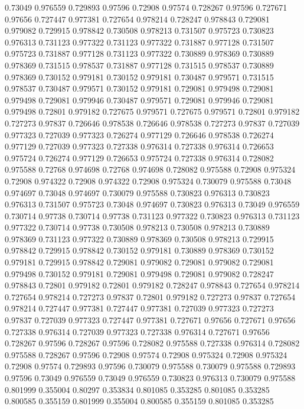 0.73049 0.976559
0.729893 0.97596
0.72908 0.97574
0.728267 0.97596
0.727671 0.97656
0.727447 0.977381
0.727654 0.978214
0.728247 0.978843
0.729081 0.979082
0.729915 0.978842
0.730508 0.978213
0.731507 0.975723
0.730823 0.976313
0.731123 0.977322
0.731123 0.977322
0.731887 0.977128
0.731507 0.975723
0.731887 0.977128
0.731123 0.977322
0.730889 0.978369
0.730889 0.978369
0.731515 0.978537
0.731887 0.977128
0.731515 0.978537
0.730889 0.978369
0.730152 0.979181
0.730152 0.979181
0.730487 0.979571
0.731515 0.978537
0.730487 0.979571
0.730152 0.979181
0.729081 0.979498
0.729081 0.979498
0.729081 0.979946
0.730487 0.979571
0.729081 0.979946
0.729081 0.979498
0.72801 0.979182
0.727675 0.979571
0.727675 0.979571
0.72801 0.979182
0.727273 0.97837
0.726646 0.978538
0.726646 0.978538
0.727273 0.97837
0.727039 0.977323
0.727039 0.977323
0.726274 0.977129
0.726646 0.978538
0.726274 0.977129
0.727039 0.977323
0.727338 0.976314
0.727338 0.976314
0.726653 0.975724
0.726274 0.977129
0.726653 0.975724
0.727338 0.976314
0.728082 0.975588
0.72768 0.974698
0.72768 0.974698
0.728082 0.975588
0.72908 0.975324
0.72908 0.974322
0.72908 0.974322
0.72908 0.975324
0.730079 0.975588
0.73048 0.974697
0.73048 0.974697
0.730079 0.975588
0.730823 0.976313
0.730823 0.976313
0.731507 0.975723
0.73048 0.974697
0.730823 0.976313
0.73049 0.976559
0.730714 0.97738
0.730714 0.97738
0.731123 0.977322
0.730823 0.976313
0.731123 0.977322
0.730714 0.97738
0.730508 0.978213
0.730508 0.978213
0.730889 0.978369
0.731123 0.977322
0.730889 0.978369
0.730508 0.978213
0.729915 0.978842
0.729915 0.978842
0.730152 0.979181
0.730889 0.978369
0.730152 0.979181
0.729915 0.978842
0.729081 0.979082
0.729081 0.979082
0.729081 0.979498
0.730152 0.979181
0.729081 0.979498
0.729081 0.979082
0.728247 0.978843
0.72801 0.979182
0.72801 0.979182
0.728247 0.978843
0.727654 0.978214
0.727654 0.978214
0.727273 0.97837
0.72801 0.979182
0.727273 0.97837
0.727654 0.978214
0.727447 0.977381
0.727447 0.977381
0.727039 0.977323
0.727273 0.97837
0.727039 0.977323
0.727447 0.977381
0.727671 0.97656
0.727671 0.97656
0.727338 0.976314
0.727039 0.977323
0.727338 0.976314
0.727671 0.97656
0.728267 0.97596
0.728267 0.97596
0.728082 0.975588
0.727338 0.976314
0.728082 0.975588
0.728267 0.97596
0.72908 0.97574
0.72908 0.975324
0.72908 0.975324
0.72908 0.97574
0.729893 0.97596
0.730079 0.975588
0.730079 0.975588
0.729893 0.97596
0.73049 0.976559
0.73049 0.976559
0.730823 0.976313
0.730079 0.975588
0.801999 0.355004
0.80297 0.353834
0.801085 0.353285
0.801085 0.353285
0.800585 0.355159
0.801999 0.355004
0.800585 0.355159
0.801085 0.353285
